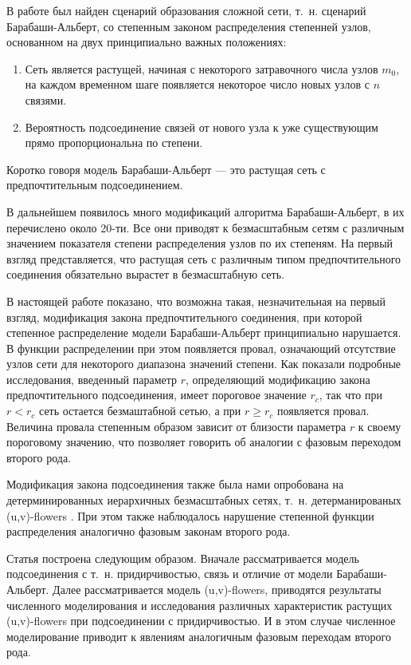 \documentclass[10pt,aps,pra]{revtex4-1}
\begin{document}
В работе \cite{AlBa1} был найден сценарий образования сложной сети, т. н. сценарий Барабаши-Альберт, со степенным законом распределения степенней узлов, основанном на двух принципиально важных положениях:
\begin{enumerate} 
\item Сеть является растущей, начиная с некоторого затравочного числа узлов $m_0$, на каждом временном шаге появляется некоторое число новых узлов с $n$ связями.
\item Вероятность подсоединение связей от нового узла к уже существующим прямо пропорциональна по степени.
\end{enumerate}
Коротко говоря модель Барабаши-Альберт — это растущая сеть с предпочтительным подсоединением.

В дальнейшем появилось много модификаций алгоритма Барабаши-Альберт, в \cite{AlBa2} их перечислено около 20-ти. Все они приводят к безмасштабным сетям с различным значением показателя степени распределения узлов по их степеням. На первый взгляд представляется, что растущая сеть с различным типом предпочтительного соединения обязательно вырастет в безмасштабную сеть.

В настоящей работе показано, что возможна такая, незначительная на первый взгляд, модификация закона предпочтительного соединения, при которой степенное распределение модели Барабаши-Альберт принципиально нарушается. В функции распределении при этом появляется провал, означающий отсутствие узлов сети для некоторого диапазона значений степени. Как показали подробные исследования, введенный параметр $r$, определяющий модификацию закона предпочтительного подсоединения, имеет пороговое значение $r_c$, так что при $r<r_c$ сеть остается безмаштабной сетью, а при $r \geq r_c$ появляется провал. Величина провала степенным образом зависит от близости параметра $r$ к своему пороговому значению, что позволяет говорить об аналогии с фазовым переходом второго рода.

Модификация закона подсоединения также была нами опробована на детерминированных иерархичных безмасштабных сетях, т. н. детерманированых (u,v)-flowers \cite{Dor1}. При этом также наблюдалось нарушение степенной функции распределения аналогично фазовым законам второго рода.

Статья построена следующим образом. Вначале рассматривается модель подсоединения с т. н. придирчивостью, связь и отличие от модели Барабаши-Альберт. Далее рассматривается модель (u,v)-flowers, приводятся результаты численного моделирования и исследования различных характеристик растущих (u,v)-flowers при подсоединении с придирчивостью. И в этом случае численное моделирование приводит к явлениям аналогичным фазовым переходам второго рода.
\end{document}

